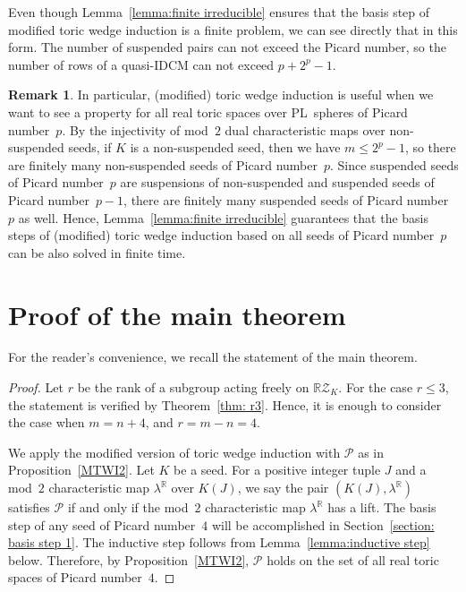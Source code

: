 \documentclass[11pt]{amsart}
\theoremstyle{plain}
\numberwithin{equation}{section}
\theoremstyle{definition}
\newtheorem{remark}[theorem]{Remark}
\newcommand{\R}{\mathbb{R}}
\newcommand{\cP}{\mathcal{P}}
\newcommand{\cZ}{\mathcal{Z}}
\begin{document}
Even though Lemma~\ref{lemma:finite irreducible} ensures that the basis step of modified toric wedge induction is a finite problem, we can see directly that in this form.
The number of suspended pairs can not exceed the Picard number, so the number of rows of a quasi-IDCM can not exceed $p+2^p-1$.

\begin{remark}
In particular, (modified) toric wedge induction is useful when we want to see a property for all real toric spaces over PL~spheres of Picard number~$p$.
By the injectivity of mod~$2$ dual characteristic maps over non-suspended seeds, if $K$ is a non-suspended seed, then we have $m \leq 2^p-1$, so there are finitely many non-suspended seeds of Picard number~$p$.
Since suspended seeds of Picard number~$p$ are suspensions of non-suspended and suspended seeds of Picard number~$p-1$, there are finitely many suspended seeds of Picard number~$p$ as well.
Hence, Lemma~\ref{lemma:finite irreducible} guarantees that the basis steps of (modified) toric wedge induction based on all seeds of Picard number~$p$ can be also solved in finite time.
\end{remark}

\section{Proof of the main theorem}
For the reader's convenience, we recall the statement of the main theorem.
\main*

\begin{proof}

Let $r$ be the rank of a subgroup acting freely on $\R \cZ_K$.
For the case $r \leq 3$, the statement is verified by Theorem~\ref{thm: r3}.
Hence, it is enough to consider the case when $m=n+4$, and $r=m-n=4$.

We apply the modified version of toric wedge induction with $\cP$ as in Proposition~\ref{MTWI2}.
Let $K$ be a seed.
For a positive integer tuple $J$ and a mod~$2$ characteristic map $\lambda^\R$ over $K(J)$, we say the pair $(K(J), \lambda^\R)$ satisfies $\cP$ if and only if the mod~$2$ characteristic map $\lambda^\R$ has a lift.
The basis step of any seed of Picard number~$4$ will be accomplished in Section~\ref{section: basis step 1}.
The inductive step follows from Lemma~\ref{lemma:inductive step} below.
Therefore, by Proposition~\ref{MTWI2}, $\cP$ holds on the set of all real toric spaces of Picard number~$4$.
\end{proof}
\end{document}
